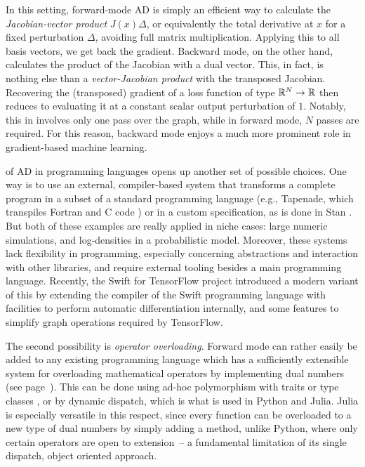 In this setting, forward-mode AD is simply an efficient way to calculate the \emph{Jacobian-vector
  product} \(J(x) \Delta\), or equivalently the total derivative at \(x\) for a fixed perturbation
\(\Delta\), avoiding full matrix multiplication.  Applying this to all basis vectors, we get back
the gradient.  Backward mode, on the other hand, calculates the product of the Jacobian with a dual
vector.  This, in fact, is nothing else than a \emph{vector-Jacobian product} with the transposed
Jacobian.  Recovering the (transposed) gradient of a loss function of type \(\mathbb{R}^N \to \mathbb{R}\) then
reduces to evaluating it at a constant scalar output perturbation of \(1\).  Notably, this in
involves only one pass over the graph, while in forward mode, \(N\) passes are required.  For this
reason, backward mode enjoys a much more prominent role in gradient-based machine learning.

 of AD in programming languages opens up another set of
possible choices.  One way is to use an external, compiler-based system that transforms a complete
program in a subset of a standard programming language (e.g., Tapenade, which transpiles Fortran and
C code \parencite{tapenadedevelopers2019tapenade}) or in a custom specification, as is done in Stan
\parencite{carpenter2015stan}.  But both of these examples are really applied in niche cases: large
numeric simulations, and log-densities in a probabilistic model.  Moreover, these systems lack
flexibility in programming, especially concerning abstractions and interaction with other libraries,
and require external tooling besides a main programming language.  Recently, the Swift for
TensorFlow project \parencite{tensorflowdevelopers2018swift,hong2018graph} introduced a modern
variant of this by extending the compiler of the Swift programming language with facilities to
perform automatic differentiation internally, and some features to simplify graph operations
required by TensorFlow.

The second possibility is \emph{operator overloading}.  Forward mode can rather easily be added to
any existing programming language which has a sufficiently extensible system for overloading
mathematical operators by implementing dual numbers (see page~\pageref{sec:dual-numbers}).  This can
be done using ad-hoc polymorphism with traits \parencite{amin2016dependent} or type classes
\parencite{wadler1989how}, or by dynamic dispatch, which is what is used in Python and Julia.  Julia
is especially versatile in this respect, since every function can be overloaded to a new type of
dual numbers by simply adding a method, unlike Python, where only certain operators are open to
extension~-- a fundamental limitation of its single dispatch, object oriented approach.


